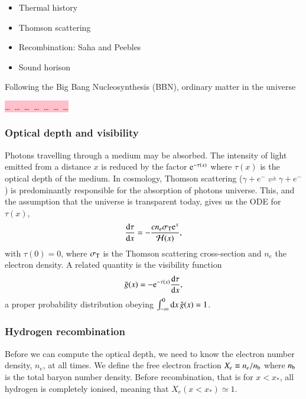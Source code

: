 
\begin{itemize}
    \item Thermal history
    \item Thomson scattering
    \item Recombination: Saha and Peebles
    \item Sound horison
\end{itemize}

Following the Big Bang Nucleosynthesis (BBN), ordinary matter in the universe 

\colorbox{pink}{\dots \, \dots \, \dots \, \dots \, \dots \, \dots \, \dots }


\subsubsection{Optical depth and visibility}\label{mil2:theo:sec:optical_depth}
    Photons travelling through a medium may be absorbed. The intensity of light emitted from a distance $x$ is reduced by the factor $\mathrm{e}^{-\tau(x)}$ where $\tau(x)$ is the optical depth of the medium. In cosmology, Thomson scattering ($\gamma + e^{-} \rightleftharpoons \gamma+ e^{-}$) is predominantly responsible for the absorption of photons universe. This, and the assumption that the universe is transparent today, gives us the ODE for $\tau(x)$,
    \begin{equation}\label{mil2:theo:eq:ode_tau_of_x}
        \dv{\tau}{x} = - \frac{cn_e \sigma_\mathrm{T}\mathrm{e}^{x}}{\mathcal{H}(x)},
    \end{equation}
    with $\tau(0)=0$, where $\sigma_\mathrm{T}$ is the Thomson scattering cross-section and $n_e$ the electron density. A related quantity is the visibility function
    \begin{equation}\label{mil2:theo:eq:gt_of_x}
        \tilde{g}(x)= - \mathrm{e}^{-\tau(x)} \dv{\tau}{x},
    \end{equation}
    a proper probability distribution obeying $\int_{-\infty}^{0}\mathrm{d} x\, \tilde{g}(x) = 1$. 

\subsubsection{Hydrogen recombination}\label{mil2:theo:sec:recombination}
    Before we can compute the optical depth, we need to know the electron number density, $n_e$, at all times. We define the free electron fraction $X_e\equiv n_e/n_\mathrm{b}$ where $n_\mathrm{b}$ is the total baryon number density. Before recombination, that is for $x<x_*$, all hydrogen is completely ionised, meaning that $X_e(x\!<\!x_*)\simeq 1$.

